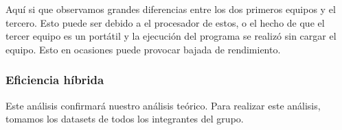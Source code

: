 \documentclass[10pt,a4paper]{article}
\begin{document}
\begin{table}[h!]
	\centering
	\footnotesize
		\hspace{2cm}
		\hspace{2cm}
		\caption{Experiencia empírica de algoritmo de Hanoi}
\end{table}

Aquí si que observamos grandes diferencias entre los dos primeros equipos y el tercero. Esto puede ser debido a el procesador de estos, o el hecho de que el tercer equipo es un portátil y la ejecución del programa se realizó sin cargar el equipo. Esto en ocasiones puede provocar bajada de rendimiento.

\subsubsection{Eficiencia híbrida}

Este análisis confirmará nuestro análisis teórico. Para realizar este análisis, tomamos los datasets de todos los integrantes del grupo.
\end{document}
